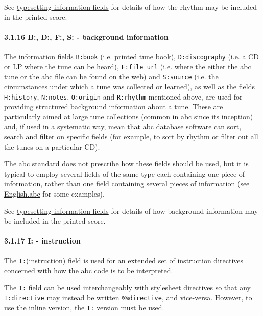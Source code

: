 \documentclass[oneside]{book}
\let\oldparagraph\paragraph
\renewcommand{\paragraph}[1]{\oldparagraph{#1}\mbox{}}
\begin{document}
See \protect\hyperlink{typesetting_information_fields}{typesetting
information fields} for details of how the rhythm may be included in the
printed score.

\hypertarget{bdfsbackground_information}{\paragraph{3.1.16 B:, D:, F:,
S: - background information}\label{bdfsbackground_information}}

The \protect\hyperlink{information_field_definition}{information fields}
\texttt{B:book} (i.e. printed tune book), \texttt{D:discography} (i.e. a
CD or LP where the tune can be heard), \texttt{F:file\ url} (i.e. where
the either the \protect\hyperlink{abc_tune_definition}{abc tune} or the
\protect\hyperlink{abc_file_definition}{abc file} can be found on the
web) and \texttt{S:source} (i.e. the circumstances under which a tune
was collected or learned), as well as the fields \texttt{H:history},
\texttt{N:notes}, \texttt{O:origin} and \texttt{R:rhythm} mentioned
above, are used for providing structured background information about a
tune. These are particularly aimed at large tune collections (common in
abc since its inception) and, if used in a systematic way, mean that abc
database software can sort, search and filter on specific fields (for
example, to sort by rhythm or filter out all the tunes on a particular
CD).

The abc standard does not prescribe how these fields should be used, but
it is typical to employ several fields of the same type each containing
one piece of information, rather than one field containing several
pieces of information (see \protect\hyperlink{englishabc}{English.abc}
for some examples).

See \protect\hyperlink{typesetting_information_fields}{typesetting
information fields} for details of how background information may be
included in the printed score.

\hypertarget{iinstruction}{\paragraph{3.1.17 I: -
instruction}\label{iinstruction}}

The \texttt{I:}(instruction) field is used for an extended set of
instruction directives concerned with how the abc code is to be
interpreted.

The \texttt{I:} field can be used interchangeably with
\protect\hyperlink{stylesheet_directive_definition}{stylesheet
directives} so that any \texttt{I:directive} may instead be written
\texttt{\%\%directive}, and vice-versa. However, to use the
\protect\hyperlink{use_of_fields_within_the_tune_body}{inline} version,
the \texttt{I:} version must be used.
\end{document}
